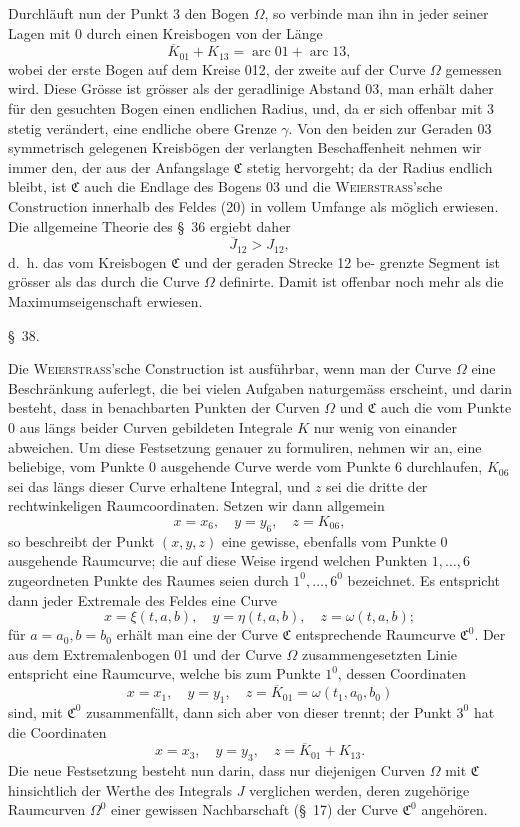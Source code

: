 \documentclass[11pt,a4paper,leqno]{article}
\begin{document}
Durchläuft nun der Punkt 3 den Bogen $\Omega$, so verbinde man ihn in jeder seiner Lagen mit 0 durch einen Kreisbogen von der Länge
\[
\overline{K}_{01}+K_{13}=\operatorname{arc}01+\operatorname{arc}13,
\]
wobei der erste Bogen auf dem Kreise 012, der zweite auf der Curve $\Omega$ gemessen wird. Diese Grösse ist grösser als der geradlinige Abstand 03, man erhält daher für den gesuchten Bogen einen endlichen Radius, und, da er sich offenbar mit 3 stetig verändert, eine endliche obere Grenze $\gamma$. Von den beiden zur Geraden 03 symmetrisch gelegenen Kreisbögen der verlangten Beschaffenheit nehmen wir immer den, der aus der Anfangslage $\mathfrak{C}$ stetig hervorgeht; da der Radius endlich bleibt, ist $\mathfrak{C}$ auch die Endlage des Bogens 03 und die \textsc{Weierstrass}'sche Construction innerhalb des Feldes (20) in vollem Umfange als möglich erwiesen. Die allgemeine Theorie des \S~36 ergiebt daher
\[
\overline{J}_{12}>J_{12},
\]
d.~h. das vom Kreisbogen $\mathfrak{C}$ und der geraden Strecke 12 be-
grenzte Segment ist grösser als das durch die Curve $\Omega$ definirte. Damit ist offenbar noch mehr als die Maximumseigenschaft erwiesen.

\begin{center}
{\large \S~38.}
\end{center}

Die \textsc{Weierstrass}'sche Construction ist ausführbar, wenn man der Curve $\Omega$ eine Beschränkung auferlegt, die bei vielen Aufgaben naturgemäss erscheint, und darin besteht, dass in benachbarten Punkten der Curven $\Omega$ und $\mathfrak{C}$ auch die vom Punkte 0 aus längs beider Curven gebildeten Integrale $K$ nur wenig von einander abweichen. Um diese Festsetzung genauer zu formuliren, nehmen wir an, eine beliebige, vom Punkte 0 ausgehende Curve werde vom Punkte 6 durchlaufen, $K_{06}$ sei das längs dieser Curve erhaltene Integral, und $z$ sei die dritte der rechtwinkeligen Raumcoordinaten. Setzen wir dann allgemein
\[
x=x_6,\quad y=y_6,\quad z=K_{06},
\]
so beschreibt der Punkt $(x,y,z)$ eine gewisse, ebenfalls vom Punkte 0 ausgehende Raumcurve; die auf diese Weise irgend welchen Punkten $1,\ldots,6$ zugeordneten Punkte des Raumes seien durch $1^0,\ldots,6^0$ bezeichnet. Es entspricht dann jeder Extremale des Feldes eine Curve
\[
x=\xi(t,a,b),\quad y=\eta(t,a,b),\quad z=\omega(t,a,b);
\]
für $a=a_0,b=b_0$ erhält man eine der Curve $\mathfrak{C}$ entsprechende Raumcurve $\mathfrak{C}^0$. Der aus dem Extremalenbogen 01 und der Curve $\Omega$ zusammengesetzten Linie entspricht eine Raumcurve, welche bis zum Punkte $1^0$, dessen Coordinaten
\[
x=x_1,\quad y=y_1,\quad z=\overline{K}_{01}=\omega(t_1,a_0,b_0)
\]
sind, mit $\mathfrak{C}^0$ zusammenfällt, dann sich aber von dieser trennt; der Punkt $3^0$ hat die Coordinaten
\begin{equation}\tag{21}
x=x_3,\quad y=y_3,\quad z=\overline{K}_{01}+K_{13}.
\end{equation}
Die neue Festsetzung besteht nun darin, dass nur diejenigen Curven $\Omega$ mit $\mathfrak{C}$ hinsichtlich der Werthe des Integrals $J$ verglichen werden, deren zugehörige Raumcurven $\Omega^0$ einer gewissen Nachbarschaft (\S~17) der Curve $\mathfrak{C}^0$ angehören.
\end{document}
